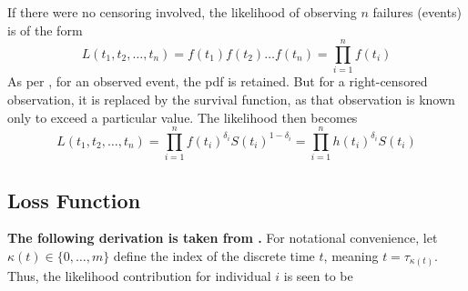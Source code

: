 \documentclass[%
 reprint,
 amsmath,amssymb,
 aps,
]{revtex4-2}
\begin{document}
If there were no censoring involved, the likelihood of observing $n$ failures (events) is of the form
\[
L(t_1 , t_2 , \ldots , t_n) = f(t_1)f(t_2)\ldots f(t_n)=\prod^{n}_{i=1}f(t_i)
\]
As per \cite{Moore_2016}, for an observed event, the pdf is retained. But for a right-censored observation, it is replaced by the survival function, as that observation is known only to exceed a particular value. The likelihood then becomes
\[
L(t_1 , t_2 , \ldots , t_n) = \prod^{n}_{i=1}f(t_i)^{\delta_i}S(t_i)^{1-\delta_i}=\prod^{n}_{i=1}h(t_i)^{\delta_i}S(t_i)
\]

\subsection{\label{loss}Loss Function}
\textbf{The following derivation is taken from \cite{kvamme_continuous_2019}.} For notational convenience, let $\kappa(t) \in \{0, \ldots , m\}$ define the index of the discrete time $t$, meaning $t = \tau_{\kappa(t)}$. Thus, the likelihood contribution for individual $i$ is seen to be 
\end{document}
